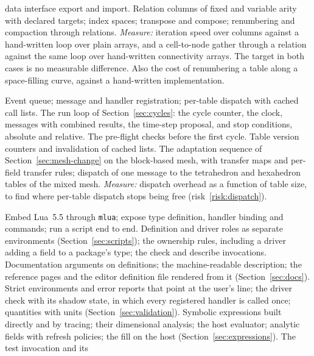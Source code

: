 \documentclass[11pt,a4paper]{article}
\newcommand{\code}[1]{\texttt{#1}}
\begin{document}
\begin{description}[style=nextline,leftmargin=2em]
        data interface export and import.
        Relation columns of fixed and variable arity with declared targets;
        index spaces; transpose and compose; renumbering and compaction
        through relations.
        \emph{Measure:} iteration speed over columns against a hand-written
        loop over plain arrays, and a cell-to-node gather through a relation
        against the same loop over hand-written connectivity arrays.  The
        target in both cases is no measurable difference.  Also the cost of
        renumbering a table along a space-filling curve, against a
        hand-written implementation.
  \item[M2. Events and dispatch.]
        Event queue; message and handler registration; per-table dispatch
        with cached call lists.  The run loop of Section~\ref{sec:cycles}:
        the cycle counter, the clock, messages with combined results, the
        time-step proposal, and stop conditions, absolute and relative.
        The pre-flight checks before the first cycle.  Table version counters and invalidation of
        cached lists.  The adaptation sequence of
        Section~\ref{sec:mesh-change} on the block-based mesh, with transfer
        maps and per-field transfer rules; dispatch of one message to the
        tetrahedron and hexahedron tables of the mixed mesh.
        \emph{Measure:} dispatch overhead as a function of table size, to find
        where per-table dispatch stops being free (risk~\ref{risk:dispatch}).
  \item[M3. Lua front end.]
        Embed Lua~5.5 through \code{mlua}; expose type definition, handler
        binding and commands; run a script end to end.  Definition and driver
        roles as separate environments (Section~\ref{sec:scripts}); the
        ownership rules, including a driver adding a field to a package's
        type; the check and describe invocations.  Documentation
        arguments on definitions; the machine-readable description; the
        reference pages and the editor definition file rendered from it
        (Section~\ref{sec:docs}).  Strict environments and error reports
        that point at the user's line; the driver check with its shadow
        state, in which every registered handler is called once; quantities
        with units (Section~\ref{sec:validation}).  Symbolic expressions
        built directly and by tracing; their dimensional analysis; the host
        evaluator; analytic fields with refresh policies; the fill on the
        host (Section~\ref{sec:expressions}).  The test invocation and its

\end{description}
\end{document}

